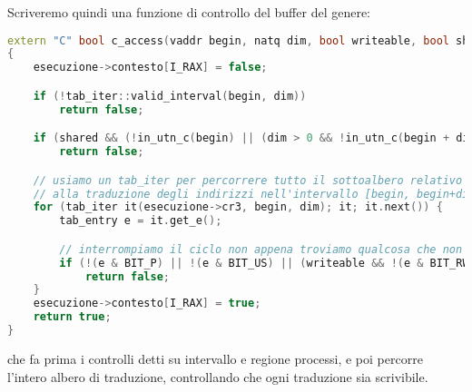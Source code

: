 \documentclass[a4paper,11pt]{article}
\begin{document}
Scriveremo quindi una funzione di controllo del buffer del genere:
\begin{lstlisting}[language=C++, style=codestyle]	
extern "C" bool c_access(vaddr begin, natq dim, bool writeable, bool shared = true)
{
	esecuzione->contesto[I_RAX] = false;

	if (!tab_iter::valid_interval(begin, dim))
		return false;

	if (shared && (!in_utn_c(begin) || (dim > 0 && !in_utn_c(begin + dim - 1))))
		return false;

	// usiamo un tab_iter per percorrere tutto il sottoalbero relativo
	// alla traduzione degli indirizzi nell'intervallo [begin, begin+dim).
	for (tab_iter it(esecuzione->cr3, begin, dim); it; it.next()) {
		tab_entry e = it.get_e();

		// interrompiamo il ciclo non appena troviamo qualcosa che non va
		if (!(e & BIT_P) || !(e & BIT_US) || (writeable && !(e & BIT_RW)))
			return false;
	}
	esecuzione->contesto[I_RAX] = true;
	return true;
}
\end{lstlisting}
che fa prima i controlli detti su intervallo e regione processi, e poi percorre l'intero albero di traduzione, controllando che ogni traduzione sia scrivibile.
\end{document}
